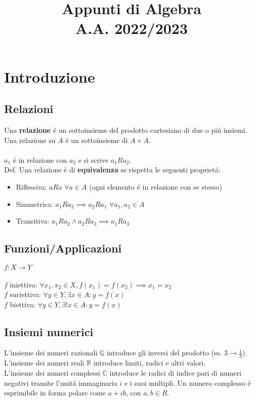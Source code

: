 \documentclass{article}
\title{
	Appunti di Algebra \\
	\large A.A. 2022/2023
}
\date{}
\begin{document}
\maketitle

\section{Introduzione}

\subsection{Relazioni}
Una \textbf{relazione} é un sottoinsieme del prodotto cartesiano di due o piú insiemi.\\
Una relazione su $A$ é un sottoinsieme di $A \times A$. \\\\
$a_{1}$ é in relazione con $a_{2}$ e si scrive $a_{1} R a_{2}$. \\
Def. Una relazione é di \textbf{equivalenza} se rispetta le seguenti proprietá:
\begin{itemize}
	\item[] Riflessiva: $a R a$ $\forall a \in A$ (ogni elemento é in relazione con se stesso)
	\item[] Simmetrica: $a_{1} R a_{2} \implies a_{2} R a_{1}$ $\forall a_{1}, a_{2} \in A$
	\item[] Transitiva: $a_1 R a_2 \wedge a_2 R a_3 \implies a_1 R a_3$
\end{itemize}

\subsection{Funzioni/Applicazioni}
$f : X \rightarrow Y$\\\\
$f$ iniettiva: $\forall x_1, x_2 \in X, f(x_1) = f(x_2) \implies x_1=x_2$ \\
$f$ suriettiva: $\forall y \in Y, \exists x \in A : y = f(x)$ \\
$f$ biettiva: $\forall y \in Y, \exists! x \in A : y = f(x)$

\subsection{Insiemi numerici}
L'insieme dei numeri razionali $\mathbb{Q}$ introduce gli inversi del prodotto (es. $3 \rightarrow \frac{1}{3}$). \\
L'insieme dei numeri reali $\mathbb{R}$ introduce limiti, radici e altri valori. \\
L'insieme dei numeri complessi $\mathbb{C}$ introduce le radici di indice pari di numeri negativi tramite l'unitá immaginaria $i$ e i suoi multipli. Un numero complesso é esprimibile in forma polare come $a+ib$, con $a,b \in R$.
\end{document}
